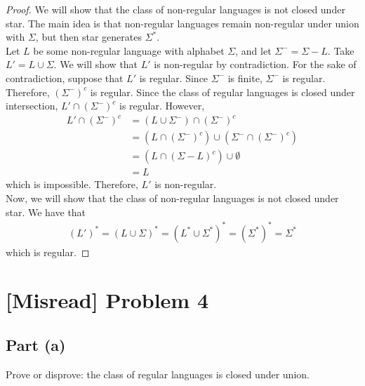 \documentclass{article}
\begin{document}
\begin{proof}
    We will show that the class of non-regular languages is not closed under star. The main idea is that non-regular languages remain non-regular under union 
    with $\Sigma$, but then star generates $\Sigma^*$. \\

    \noindent
    Let $L$ be some non-regular language with alphabet $\Sigma$, and let $\Sigma^{-} = \Sigma - L$. Take $L' = L \cup \Sigma$. We will show that $L'$ is 
    non-regular by contradiction. For the sake of contradiction, suppose that $L'$ is regular. Since $\Sigma^{-}$ is finite, $\Sigma^{-}$ is regular. Therefore,
    $(\Sigma^{-})^c$ is regular. Since the class of regular languages is closed under intersection, $L' \cap (\Sigma^{-})^c$ is regular. However,
    \begin{align*}
        L' \cap (\Sigma^{-})^c &= (L \cup \Sigma^{-}) \cap (\Sigma^{-})^c \\
        &= (L \cap (\Sigma^{-})^c) \cup (\Sigma^{-} \cap (\Sigma^{-})^c) \\
        &= (L \cap (\Sigma - L)^c) \cup \emptyset \\
        &= L
    \end{align*}
    which is impossible. Therefore, $L'$ is non-regular. \\
    
    \noindent
    Now, we will show that the class of non-regular languages is not closed under star. We have that 
    \begin{align*}
        (L')^* = (L \cup \Sigma)^* = (L^* \cup \Sigma^*)^* = (\Sigma^*)^* = \Sigma^*
    \end{align*}
    which is regular.
\end{proof}

\section*{[Misread] Problem 4}

\subsection*{Part (a)}

Prove or disprove: the class of regular languages is closed under union.
\end{document}
